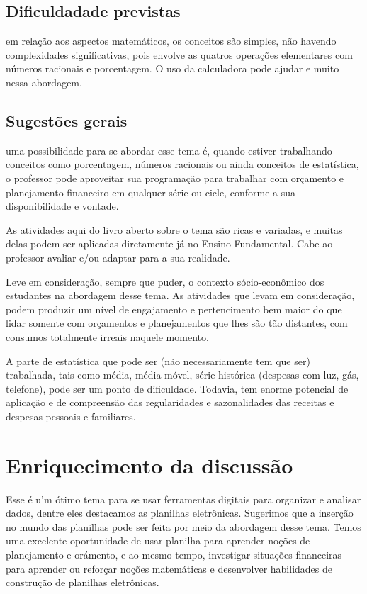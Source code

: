 \begin{paginatexto}
\subsection{Dificuldadade previstas} em relação aos aspectos matemáticos, os conceitos são simples, não havendo complexidades significativas, pois envolve as quatros operações elementares com números racionais e porcentagem. O uso da calculadora pode ajudar e muito nessa abordagem.

\subsection{Sugestões gerais} uma possibilidade para se abordar esse tema é, quando estiver trabalhando conceitos como porcentagem, números racionais ou ainda conceitos de estatística, o professor pode aproveitar sua programação para trabalhar com orçamento e planejamento financeiro em qualquer série ou cicle, conforme a sua disponibilidade e vontade.

As atividades aqui do livro aberto sobre o tema são ricas e variadas, e muitas delas podem ser aplicadas diretamente já no Ensino Fundamental. Cabe ao professor avaliar e/ou adaptar para a sua realidade.

Leve em consideração, sempre que puder, o contexto sócio-econômico dos estudantes na abordagem desse tema. As atividades que levam em consideração, podem produzir um nível de engajamento e pertencimento bem maior do que lidar somente com orçamentos e planejamentos que lhes são tão distantes, com consumos totalmente irreais naquele momento.

A parte de estatística que pode ser (não necessariamente tem que ser) trabalhada, tais como média, média móvel, série histórica (despesas com luz, gás, telefone), pode ser um ponto de dificuldade. Todavia, tem enorme potencial de aplicação e de compreensão das regularidades e sazonalidades das receitas e despesas pessoais e familiares.

\section*{Enriquecimento da discussão}

Esse é u'm ótimo tema para se usar ferramentas digitais para organizar e analisar dados, dentre eles destacamos as planilhas eletrônicas. Sugerimos que a inserção no mundo das planilhas pode ser feita por meio da abordagem desse tema. Temos uma excelente oportunidade de usar planilha para aprender noções de planejamento e orámento, e ao mesmo tempo, investigar situações financeiras para aprender ou reforçar noções matemáticas e desenvolver habilidades de construção de planilhas eletrônicas.


\end{paginatexto}
